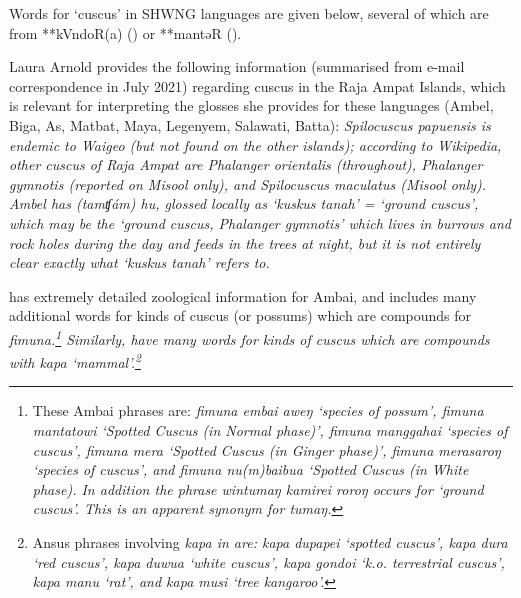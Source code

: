 \largerpage
{}
Words for `cuscus' in SHWNG languages are given below,
several of which are from **kVndoR(a) () or **mantəR ().

Laura Arnold provides the following information (summarised from
e-mail correspondence in July 2021) regarding cuscus in the Raja
Ampat Islands, which is relevant for interpreting the glosses she provides for
these languages (Ambel, Biga, As, Matbat, Ma{\Q}ya,
Legenyem, Salawati, Batta): \it{Spilocuscus papuensis} is endemic
to Waigeo (but not found on the other islands); according to
Wikipedia, other cuscus of Raja Ampat are \it{Phalanger orientalis} (throughout),
\it{Phalanger gymnotis} (reported on Misool only),
and \it{Spilocuscus maculatus} (Misool only).
Ambel has
\it{(tamʧám) hu}, glossed locally
as ‘kuskus tanah’ = ‘ground cuscus’,
which may be the ‘ground cuscus,
\it{Phalanger gymnotis}’ which lives in burrows
and rock holes during the day
and feeds in the trees at night,
but it is not entirely clear exactly what ‘kuskus tanah’ refers to.

\cite{Price2002} has extremely detailed zoological
information for Ambai, and includes many additional words for
kinds of cuscus (or possums) which are compounds for \it{fimuna}.\footnote{
		These Ambai phrases are:
		\it{fimuna embai aweŋ} `species of possum',
		\it{fimuna mantatowi} `Spotted Cuscus (in Normal phase)',
		\it{fimuna manggahai} `species of cuscus',
		\it{fimuna mera} `Spotted Cuscus (in Ginger phase)',
		\it{fimuna merasaroŋ} `species of cuscus', and
		\it{fimuna nu(m)baibua} `Spotted Cuscus (in White phase).
		In addition the phrase \it{wintumaŋ kamirei roroŋ} occurs for `ground cuscus'.
		This is an apparent synonym for \it{tumaŋ}.}
Similarly, \cite{PriceDonohue2009} have many words for
kinds of cuscus which are compounds with \it{kapa} `mammal'.\footnote{
		Ansus phrases involving \it{kapa} in \citet{PriceDonohue2009} are:
		\it{kapa dupapei} `spotted cuscus',
		\it{kapa dura} `red cuscus',
		\it{kapa duwua} `white cuscus',
		\it{kapa gondoi} `k.o. terrestrial cuscus',
		\it{kapa manu} `rat', and
		\it{kapa musi} `tree kangaroo'.}

